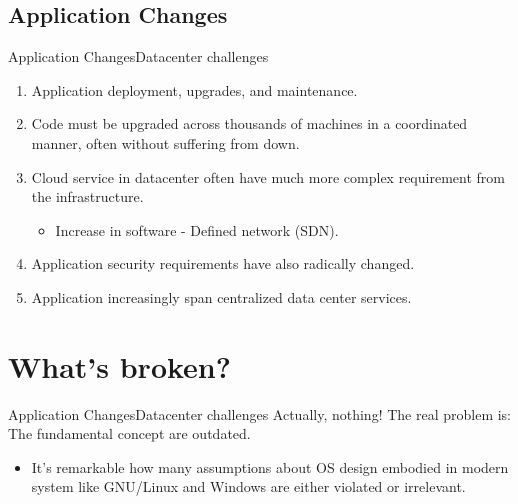 \documentclass[10pt]{beamer}
\begin{document}
\subsection{Application Changes}
\begin{frame}{Application Changes}{Datacenter challenges}
  \begin{enumerate}
    \item Application deployment, upgrades, and maintenance.
    \item Code must be upgraded across thousands of machines in a coordinated
          manner, often without suffering from down.
    \item Cloud service in datacenter often have much more complex requirement
          from the infrastructure.
     \begin{itemize}
      \item Increase in software - Defined network (SDN).
     \end{itemize}
    \item Application security requirements have also radically changed.
    \item Application increasingly span centralized data center services.
  \end{enumerate}
\end{frame}


\section{What's broken?}
\begin{frame}{Application Changes}{Datacenter challenges}
Actually, nothing! The real problem is: The fundamental concept are outdated.
  \begin{itemize}
    \item It's remarkable how many assumptions about OS design embodied in
      modern system like GNU/Linux and Windows are either violated or
      irrelevant.
  \end{itemize}
\end{frame}

\end{document}
